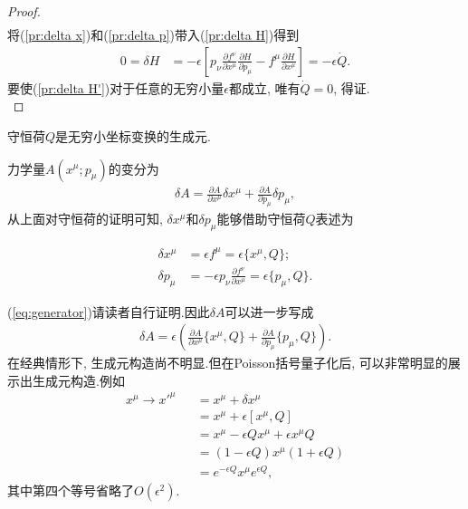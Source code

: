 \begin{proof}
\begin{equation}
\begin{split}
		\end{split}
		\end{equation}
		将(\ref{pr:delta x})和(\ref{pr:delta p})带入(\ref{pr:delta H})得到
		\begin{equation}\label{pr:delta H'}
		\begin{split}
			0=\delta H&=-\epsilon\left[p_\nu\frac{\partial f^\nu}{\partial x^\mu}\frac{\partial H}{\partial p_\mu}-f^\mu\frac{\partial H}{\partial x^\mu}\right]=-\epsilon\dot{Q}.
		\end{split}
		\end{equation}
		要使(\ref{pr:delta H'})对于任意的无穷小量$\epsilon$都成立, 唯有$\dot{Q}=0$, 得证.\\
		\end{proof}

		\begin{theorem}
		守恒荷$Q$是无穷小坐标变换的生成元.
		\end{theorem}

		力学量$A(x^\mu;p_\mu)$的变分为
		\begin{eqnarray*}
		\delta A=\frac{\partial A}{\partial x^\mu}\delta x^\mu+\frac{\partial A}{\partial p_\mu}\delta p_\mu,
		\end{eqnarray*}
		从上面对守恒荷的证明可知, $\delta x^\mu$和$\delta p_\mu$能够借助守恒荷$Q$表述为

		\begin{equation}\label{eq:generator}
			\begin{split}
				\delta x^\mu&=\epsilon f^\mu=\epsilon\{x^\mu,Q\};\\
				\delta p_\mu&=-\epsilon p_\nu\frac{\partial f^\nu}{\partial x^\mu}=\epsilon\{p_\mu,Q\}.
			\end{split}
		\end{equation}

		(\ref{eq:generator})请读者自行证明.因此$\delta A$可以进一步写成
		\begin{eqnarray*}
		\delta A=\epsilon\left(\frac{\partial A}{\partial x^\mu}\{x^\mu,Q\}+\frac{\partial A}{\partial p_\mu}\{p_\mu,Q\}\right).
		\end{eqnarray*}
		在经典情形下, 生成元构造尚不明显.但在Poisson括号量子化后, 可以非常明显的展示出生成元构造.例如
		\begin{eqnarray*}
		x^\mu\rightarrow x'^\mu&&=x^\mu+\delta x^\mu\\
		&&=x^\mu+\epsilon[x^\mu,Q]\\
		&&=x^\mu-\epsilon Qx^\mu+\epsilon x^\mu Q\\
		&&=\left(1-\epsilon Q\right)x^\mu\left(1+\epsilon Q\right)\\
		&&=e^{-\epsilon Q}x^\mu e^{\epsilon Q},
		\end{eqnarray*}
		其中第四个等号省略了$O(\epsilon^2)$.